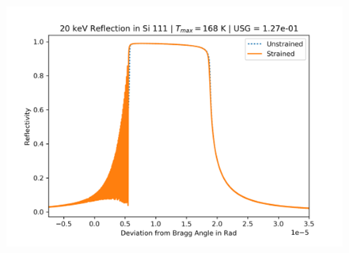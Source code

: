 \documentclass[preprint]{iucr}              %
\begin{document}
\begin{figure}
\includegraphics{images/111_20keV_8.png}
\label{fig:111usg20kev}
\end{figure}
\end{document}
